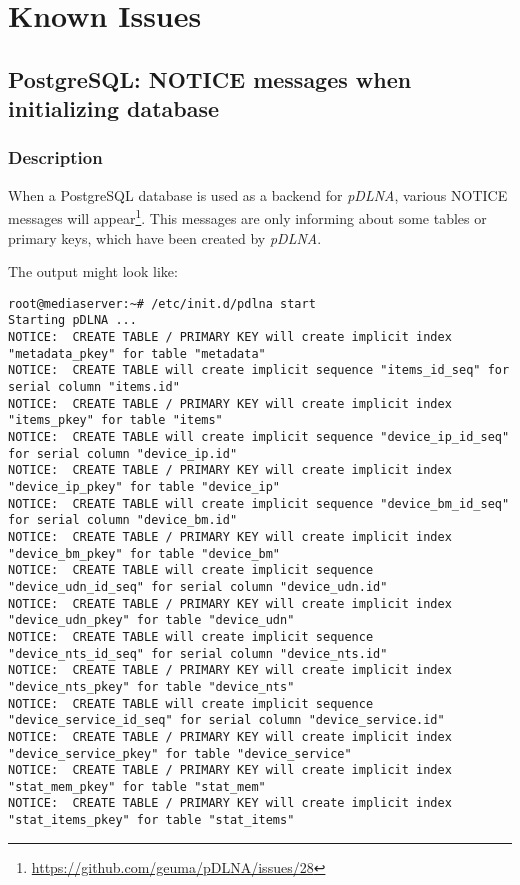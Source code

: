 %
%

\chapter{Known Issues}
\label{knownissues}


\section{PostgreSQL: NOTICE messages when initializing database}

\subsection{Description}

When a PostgreSQL database is used as a backend for {\em pDLNA}, various NOTICE messages will appear\footnote{\url{https://github.com/geuma/pDLNA/issues/28}}. This messages are only informing about some tables or primary keys, which have been created by {\em pDLNA}.

The output might look like:
\begin{lstlisting}
root@mediaserver:~# /etc/init.d/pdlna start
Starting pDLNA ...
NOTICE:  CREATE TABLE / PRIMARY KEY will create implicit index "metadata_pkey" for table "metadata"
NOTICE:  CREATE TABLE will create implicit sequence "items_id_seq" for serial column "items.id"
NOTICE:  CREATE TABLE / PRIMARY KEY will create implicit index "items_pkey" for table "items"
NOTICE:  CREATE TABLE will create implicit sequence "device_ip_id_seq" for serial column "device_ip.id"
NOTICE:  CREATE TABLE / PRIMARY KEY will create implicit index "device_ip_pkey" for table "device_ip"
NOTICE:  CREATE TABLE will create implicit sequence "device_bm_id_seq" for serial column "device_bm.id"
NOTICE:  CREATE TABLE / PRIMARY KEY will create implicit index "device_bm_pkey" for table "device_bm"
NOTICE:  CREATE TABLE will create implicit sequence "device_udn_id_seq" for serial column "device_udn.id"
NOTICE:  CREATE TABLE / PRIMARY KEY will create implicit index "device_udn_pkey" for table "device_udn"
NOTICE:  CREATE TABLE will create implicit sequence "device_nts_id_seq" for serial column "device_nts.id"
NOTICE:  CREATE TABLE / PRIMARY KEY will create implicit index "device_nts_pkey" for table "device_nts"
NOTICE:  CREATE TABLE will create implicit sequence "device_service_id_seq" for serial column "device_service.id"
NOTICE:  CREATE TABLE / PRIMARY KEY will create implicit index "device_service_pkey" for table "device_service"
NOTICE:  CREATE TABLE / PRIMARY KEY will create implicit index "stat_mem_pkey" for table "stat_mem"
NOTICE:  CREATE TABLE / PRIMARY KEY will create implicit index "stat_items_pkey" for table "stat_items"
\end{lstlisting}


